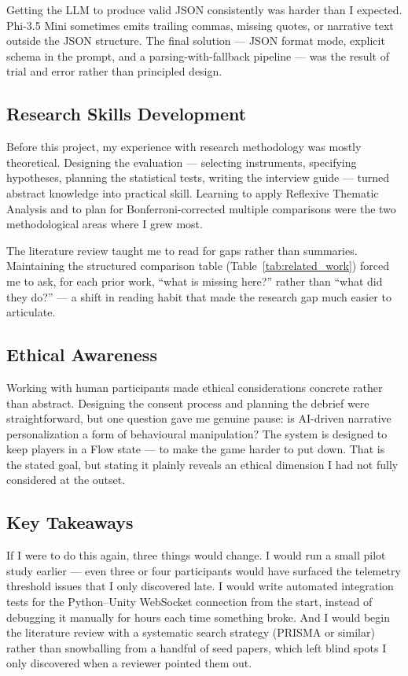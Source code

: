 Getting the LLM to produce valid JSON consistently was harder than I expected. Phi-3.5 Mini sometimes emits trailing commas, missing quotes, or narrative text outside the JSON structure. The final solution --- JSON format mode, explicit schema in the prompt, and a parsing-with-fallback pipeline --- was the result of trial and error rather than principled design.

\subsection{Research Skills Development}

Before this project, my experience with research methodology was mostly theoretical. Designing the evaluation --- selecting instruments, specifying hypotheses, planning the statistical tests, writing the interview guide --- turned abstract knowledge into practical skill. Learning to apply Reflexive Thematic Analysis \citep{braun2022thematic} and to plan for Bonferroni-corrected multiple comparisons were the two methodological areas where I grew most.

The literature review taught me to read for gaps rather than summaries. Maintaining the structured comparison table (Table~\ref{tab:related_work}) forced me to ask, for each prior work, ``what is missing here?'' rather than ``what did they do?'' --- a shift in reading habit that made the research gap much easier to articulate.

\subsection{Ethical Awareness}

Working with human participants made ethical considerations concrete rather than abstract. Designing the consent process and planning the debrief were straightforward, but one question gave me genuine pause: is AI-driven narrative personalization a form of behavioural manipulation? The system is designed to keep players in a Flow state --- to make the game harder to put down. That is the stated goal, but stating it plainly reveals an ethical dimension I had not fully considered at the outset.

\subsection{Key Takeaways}

If I were to do this again, three things would change. I would run a small pilot study earlier --- even three or four participants would have surfaced the telemetry threshold issues that I only discovered late. I would write automated integration tests for the Python--Unity WebSocket connection from the start, instead of debugging it manually for hours each time something broke. And I would begin the literature review with a systematic search strategy (PRISMA or similar) rather than snowballing from a handful of seed papers, which left blind spots I only discovered when a reviewer pointed them out.

